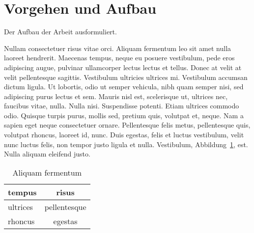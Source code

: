 \section{Vorgehen und Aufbau}

Der Aufbau der Arbeit ausformuliert.

Nullam consectetuer risus vitae orci. Aliquam fermentum leo sit amet nulla laoreet hendrerit. Maecenas tempus, neque eu posuere vestibulum, pede eros adipiscing augue, pulvinar ullamcorper lectus lectus et tellus. Donec at velit at velit pellentesque sagittis. Vestibulum ultricies ultrices mi. Vestibulum accumsan dictum ligula. Ut lobortis, odio ut semper vehicula, nibh quam semper nisi, sed adipiscing purus lectus et sem. Mauris nisl est, scelerisque ut, ultrices nec, faucibus vitae, nulla. Nulla nisi. Suspendisse potenti. Etiam ultrices commodo odio. Quisque turpis purus, mollis sed, pretium quis, volutpat et, neque. Nam a sapien eget neque consectetuer ornare. Pellentesque felis metus, pellentesque quis, volutpat rhoncus, laoreet id, nunc. Duis egestas, felis et luctus vestibulum, velit nunc luctus felis, non tempor justo ligula et nulla. Vestibulum, Abbildung~\ref{fig:tabelle}, est. Nulla aliquam eleifend justo.


\begin{table}[htb]
  \centering
  \begin{tabular}{|l|c|}
    \hline
    \textbf{tempus} & \textbf{risus} \\ \hline
    ultrices & pellentesque \\
    rhoncus & egestas \\
    \hline
  \end{tabular}
  \caption{Aliquam fermentum}\label{fig:tabelle}
\end{table}

\endinput
